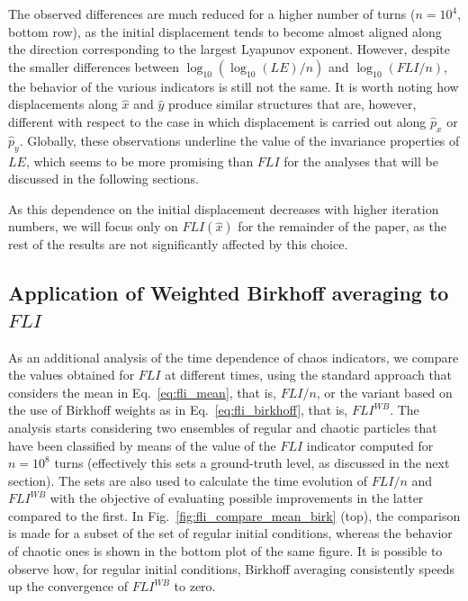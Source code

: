 The observed differences are much reduced for a higher number of turns ($n=10^4$, bottom row), as the initial displacement tends to become almost aligned along the direction corresponding to the largest Lyapunov exponent. However, despite the smaller differences between $\log_{10}(\log_{10}(LE)/n)$ and $\log_{10}(FLI/n)$, the behavior of the various indicators is still not the same. It is worth noting how displacements along $\hat{x}$ and $\hat{y}$ produce similar structures that are, however, different with respect to the case in which displacement is carried out along $\hat{p}_x$ or $\hat{p}_y$. Globally, these observations underline the value of the invariance properties of $LE$, which seems to be more promising than $FLI$ for the analyses that will be discussed in the following sections.

As this dependence on the initial displacement decreases with higher iteration numbers, we will focus only on $FLI(\hat{x})$ for the remainder of the paper, as the rest of the results are not significantly affected by this choice.

%
\subsection{Application of Weighted Birkhoff averaging to $FLI$}\label{subsec:dyn:FLI:WB}
%
As an additional analysis of the time dependence of chaos indicators, we compare the values obtained for $FLI$ at different times, using the standard approach that considers the mean in Eq.~\eqref{eq:fli_mean}, that is, $FLI/n$, or the variant based on the use of Birkhoff weights as in Eq.~\eqref{eq:fli_birkhoff}, that is, $FLI^{WB}$. The analysis starts considering two ensembles of regular and chaotic particles that have been classified by means of the value of the $FLI$ indicator computed for $n=10^8$ turns (effectively this sets a ground-truth level, as discussed in the next section). The sets are also used to calculate the time evolution of $FLI/n$ and $FLI^{WB}$ with the objective of evaluating possible improvements in the latter compared to the first. In Fig.~\ref{fig:fli_compare_mean_birk} (top), the comparison is made for a subset of the set of regular initial conditions, whereas the behavior of chaotic ones is shown in the bottom plot of the same figure. It is possible to observe how, for regular initial conditions, Birkhoff averaging consistently speeds up the convergence of $FLI^{WB}$ to zero.

